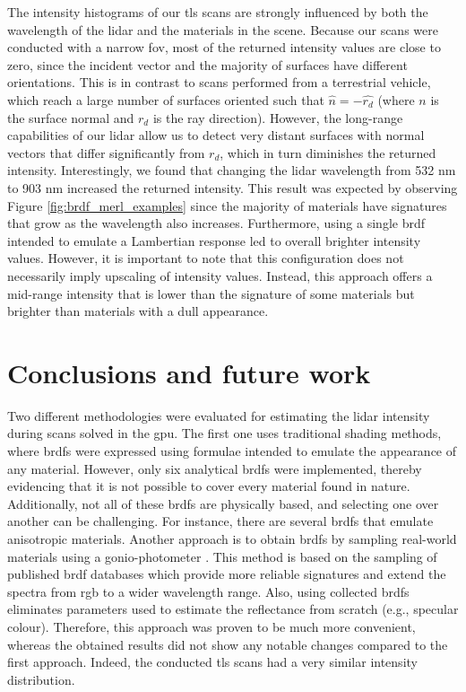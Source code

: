 The intensity histograms of our \acrshort{tls} scans are strongly influenced by both the wavelength of the \acrshort{lidar} and the materials in the scene. Because our scans were conducted with a narrow \acrshort{fov}, most of the returned intensity values are close to zero, since the incident vector and the majority of surfaces have different orientations. This is in contrast to scans performed from a terrestrial vehicle, which reach a large number of surfaces oriented such that $\hat{n} = -\hat{r_d}$ (where $n$ is the surface normal and $r_d$ is the ray direction). However, the long-range capabilities of our \acrshort{lidar} allow us to detect very distant surfaces with normal vectors that differ significantly from $r_d$, which in turn diminishes the returned intensity. Interestingly, we found that changing the \acrshort{lidar} wavelength from 532 \si{\nano\meter} to 903 \si{\nano\meter} increased the returned intensity. This result was expected by observing Figure \ref{fig:brdf_merl_examples} since the majority of materials have signatures that grow as the wavelength also increases. Furthermore, using a single \acrshort{brdf} intended to emulate a Lambertian response led to overall brighter intensity values. However, it is important to note that this configuration does not necessarily imply upscaling of intensity values. Instead, this approach offers a mid-range intensity that is lower than the signature of some materials but brighter than materials with a dull appearance.

\section{Conclusions and future work}

Two different methodologies were evaluated for estimating the \acrshort{lidar} intensity during scans solved in the \acrshort{gpu}. The first one uses traditional shading methods, where \acrshort{brdf}s were expressed using formulae intended to emulate the appearance of any material. However, only six analytical \acrshort{brdf}s were implemented, thereby evidencing that it is not possible to cover every material found in nature. Additionally, not all of these \acrshort{brdf}s are physically based, and selecting one over another can be challenging. For instance, there are several \acrshort{brdf}s that emulate anisotropic materials. Another approach is to obtain \acrshort{brdf}s by sampling real-world materials using a gonio-photometer \cite{dupuy_adaptive_2018}. This method is based on the sampling of published \acrshort{brdf} databases which provide more reliable signatures and extend the spectra from \acrshort{rgb} to a wider wavelength range. Also, using collected \acrshort{brdf}s eliminates parameters used to estimate the reflectance from scratch (e.g., specular colour). Therefore, this approach was proven to be much more convenient, whereas the obtained results did not show any notable changes compared to the first approach. Indeed, the conducted \acrshort{tls} scans had a very similar intensity distribution.

